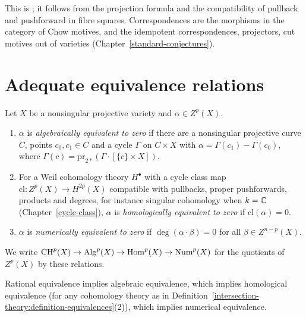 This is \cite[Proposition 16.1.1]{fulton-intersection}; it follows from the projection formula and the compatibility of pullback and pushforward in fibre squares. Correspondences are
the morphisms in the category of Chow motives, and the idempotent correspondences, projectors, cut motives out of varieties (Chapter~\ref{standard-conjectures}).

\section{Adequate equivalence relations}\label{intersection-theory:section-equivalences}

\begin{definition}\label{intersection-theory:definition-equivalences}
Let $X$ be a nonsingular projective variety and $\alpha \in Z^p(X)$.
\begin{enumerate}
\item $\alpha$ is \emph{algebraically equivalent to zero} if there are a nonsingular projective curve $C$, points $c_0, c_1 \in C$ and a cycle $\Gamma$ on $C \times X$ with
$\alpha = \Gamma(c_1) - \Gamma(c_0)$, where $\Gamma(c) = \mathrm{pr}_{2*}(\Gamma \cdot [\{c\} \times X])$.
\item For a Weil cohomology theory $H^\bullet$ with a cycle class map $\mathrm{cl} \colon Z^p(X) \to H^{2p}(X)$ compatible with pullbacks, proper pushforwards, products and degrees, for instance singular cohomology when $k = \mathbb{C}$ (Chapter~\ref{cycle-class}),
$\alpha$ is \emph{homologically equivalent to zero} if $\mathrm{cl}(\alpha) = 0$.
\item $\alpha$ is \emph{numerically equivalent to zero} if $\deg(\alpha \cdot \beta) = 0$ for all $\beta \in Z^{n-p}(X)$.
\end{enumerate}
We write $\operatorname{CH}^p(X) \to \mathrm{Alg}^p(X) \to \mathrm{Hom}^p(X) \to \mathrm{Num}^p(X)$ for the quotients of $Z^p(X)$ by these relations.
\end{definition}

\begin{proposition}\label{intersection-theory:proposition-equivalences}
Rational equivalence implies algebraic equivalence, which implies homological equivalence (for any cohomology theory as in Definition~\ref{intersection-theory:definition-equivalences}(2)), which implies numerical equivalence.
\end{proposition}

